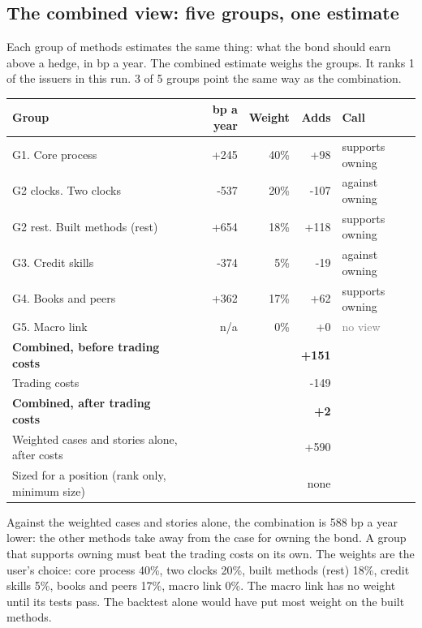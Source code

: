 \documentclass[11pt,a4paper]{article}
\begin{document}
\subsection*{The combined view: five groups, one estimate}
Each group of methods estimates the same thing: what the bond should earn above a hedge, in bp a year. The combined estimate weighs the groups. It ranks 1 of the issuers in this run. 3 of 5 groups point the same way as the combination.
\begin{center}\footnotesize\setlength{\tabcolsep}{3.5pt}\begin{tabular}{@{}lrrrl@{}}\toprule
Group & bp a year & Weight & Adds & Call \\\midrule
G1. Core process & +245 & 40\% & +98 & \textcolor{good}{supports owning} \\
G2 clocks. Two clocks & -537 & 20\% & -107 & \textcolor{bad}{against owning} \\
G2 rest. Built methods (rest) & +654 & 18\% & +118 & \textcolor{good}{supports owning} \\
G3. Credit skills & -374 & 5\% & -19 & \textcolor{bad}{against owning} \\
G4. Books and peers & +362 & 17\% & +62 & \textcolor{good}{supports owning} \\
G5. Macro link & n/a & 0\% & +0 & \textcolor{gray}{no view} \\
\textbf{Combined, before trading costs} &  &  & \textbf{+151} &  \\
Trading costs &  &  & -149 &  \\
\textbf{Combined, after trading costs} &  &  & \textbf{+2} &  \\
Weighted cases and stories alone, after costs &  &  & +590 &  \\
Sized for a position (rank only, minimum size) &  &  & none &  \\
\bottomrule\end{tabular}\end{center}
Against the weighted cases and stories alone, the combination is 588 bp a year lower: the other methods take away from the case for owning the bond. A group that supports owning must beat the trading costs on its own. The weights are the user's choice: core process 40\%, two clocks 20\%, built methods (rest) 18\%, credit skills 5\%, books and peers 17\%, macro link 0\%. The macro link has no weight until its tests pass. The backtest alone would have put most weight on the built methods.
\par\noindent{}
\end{document}
